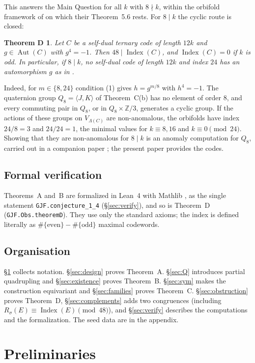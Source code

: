 \documentclass[11pt]{amsart}
\newtheorem*{thmD}{Theorem D}
\theoremstyle{definition}
\newcommand{\Z}{\mathbb{Z}}
\newcommand{\Index}{\operatorname{Index}}
\newcommand{\Aut}{\operatorname{Aut}}
\begin{document}
This answers the Main Question for all $k$ with $8\nmid k$, within the orbifold framework of
\cite[\S4]{GJF} on which their Theorem~5.6 rests. For $8\mid k$ the cyclic route is closed:

\begin{thmD}
Let $C$ be a self-dual ternary code of length $12k$ and $g\in\Aut(C)$ with $g^4=-1$. Then
$48\mid\Index(C)$, and $\Index(C)=0$ if $k$ is odd. In particular, if $8\mid k$, no self-dual code
of length $12k$ and index $24$ has an automorphism $g$ as in \cite[Thm.~5.6]{GJF}.
\end{thmD}

Indeed, for $m\in\{8,24\}$ condition (1) gives $h=g^{m/8}$ with $h^4=-1$. The quaternion group
$Q_8=\langle J,K\rangle$ of Theorem~C(b) has no element of order $8$, and every commuting pair in
$Q_8$, or in $Q_8\times\Z/3$, generates a cyclic group. If the actions of these groups on
$V_{\Lambda(C)}$ are non-anomalous, the orbifolds have index $24/8=3$ and $24/24=1$, the minimal values
for $k\equiv8,16$ and $k\equiv0\pmod{24}$. Showing that they are non-anomalous for $8\mid k$ is an
anomaly computation for $Q_8$, carried out in a companion paper \cite{II}; the present paper provides
the codes.

\subsection*{Formal verification}
Theorems~A and~B are formalized in Lean~4 with Mathlib \cite{Lean,Mathlib}, as the single
statement \texttt{GJF.conjecture\_1\_4} (\S\ref{sec:verify}), and so is Theorem~D
(\texttt{GJF.Obs.theoremD}). They use only the standard axioms;
the index is defined literally as $\#\{\text{even}\}-\#\{\text{odd}\}$ maximal codewords.

\subsection*{Organisation}
\S\ref{sec:prelim} collects notation. \S\ref{sec:design} proves Theorem~A. \S\ref{sec:Q}
introduces partial quadrupling and \S\ref{sec:existence} proves Theorem~B.
\S\ref{sec:sym} makes the construction equivariant and \S\ref{sec:families} proves Theorem~C.
\S\ref{sec:obstruction} proves Theorem~D, \S\ref{sec:complements} adds two congruences
(including $R_\sigma(E)\equiv\Index(E)\pmod{48}$), and \S\ref{sec:verify} describes the
computations and the formalization. The seed data are in the appendix.

\section{Preliminaries}\label{sec:prelim}
\end{document}
